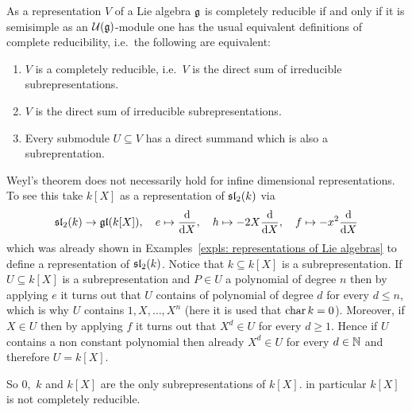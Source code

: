 \begin{rem}
 As a representation $V$ of a Lie algebra $\mathfrak{g}$ is completely reducible if and only if it is semisimple as an $\mathcal{U}(\mathfrak{g})$-module one has the usual equivalent definitions of complete reducibility, i.e.\ the following are equivalent:
 \begin{enumerate}
  \item
   $V$ is a completely reducible, i.e.\ $V$ is the direct sum of irreducible subrepresentations.
  \item
   $V$ is the direct sum of irreducible subrepresentations.
  \item
   Every submodule $U \subseteq V$ has a direct summand which is also a subreprentation.
 \end{enumerate}
\end{rem}


\begin{rem}
 Weyl’s theorem does not necessarily hold for infine dimensional representations. To see this take $k[X]$ as a representation of $\mathfrak{sl}_2(k)$ via
 \[
  \mathfrak{sl}_2(k) \to \mathfrak{gl}(k[X]), \quad
  e \mapsto \frac{\text{d}}{\text{d}X}, \quad
  h \mapsto -2X\frac{\text{d}}{\text{d}X}, \quad
  f \mapsto -x^2\frac{\text{d}}{\text{d}X}
 \]
 which was already shown in Examples~\ref{expls: representations of Lie algebras} to define a representation of $\mathfrak{sl}_2(k)$. Notice that $k \subseteq k[X]$ is a subrepresentation. If $U \subseteq k[X]$ is a subrepresentation and $P \in U$ a polynomial of degree $n$ then by applying $e$ it turns out that $U$ contains of polynomial of degree $d$ for every $d \leq n$, which is why $U$ contains $1, X, \dotsc, X^n$ (here it is used that $\operatorname{char} k = 0$). Moreover, if $X \in U$ then by applying $f$ it turns out that $X^d \in U$ for every $d \geq 1$. Hence if $U$ contains a non constant polynomial then already $X^d \in U$ for every $d \in \mathbb{N}$ and therefore $U = k[X]$.
 
 So $0,$ $k$ and $k[X]$ are the only subrepresentations of $k[X]$. in particular $k[X]$ is not completely reducible.
\end{rem}




